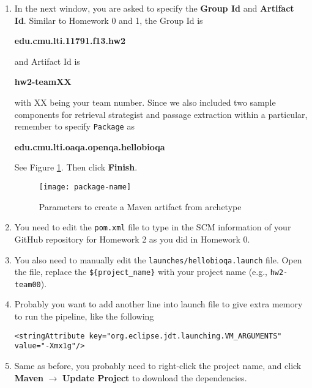 \begin{enumerate}
\item In the next window, you are asked to specify the \textbf{Group Id} and
\textbf{Artifact Id}. Similar to Homework 0 and 1, the Group Id is

\begin{center}
\textbf{edu.cmu.lti.11791.f13.hw2}
\end{center}

and Artifact Id is

\begin{center}
\textbf{hw2-teamXX}
\end{center}

with XX being your team number. Since we also included two sample components for
retrieval strategist and passage extraction within a particular, remember to
specify \texttt{Package} as

\begin{center}
\textbf{edu.cmu.lti.oaqa.openqa.hellobioqa}
\end{center}

See Figure \ref{fig:package-name}. Then click \textbf{Finish}.

\begin{figure}[t]
\centering
\texttt{[image: package-name]}
\caption{Parameters to create a Maven artifact from archetype\label{fig:package-name}}
\end{figure}

\item You need to edit the \texttt{pom.xml} file to type in the SCM information
of your GitHub repository for Homework 2 as you did in Homework 0.

\item You also need to manually edit the \texttt{launches/hellobioqa.launch}
file. Open the file, replace the \verb|${project_name}| with your project name
(e.g., \verb|hw2-team00|).

\item Probably you want to add another line into launch file to give extra
memory to run the pipeline, like the following

\begin{verbatim}
<stringAttribute key="org.eclipse.jdt.launching.VM_ARGUMENTS" value="-Xmx1g"/>
\end{verbatim}

\item Same as before, you probably need to right-click the project name, and
click \textbf{Maven} $\rightarrow$ \textbf{Update Project} to download the
dependencies.

\end{enumerate}

